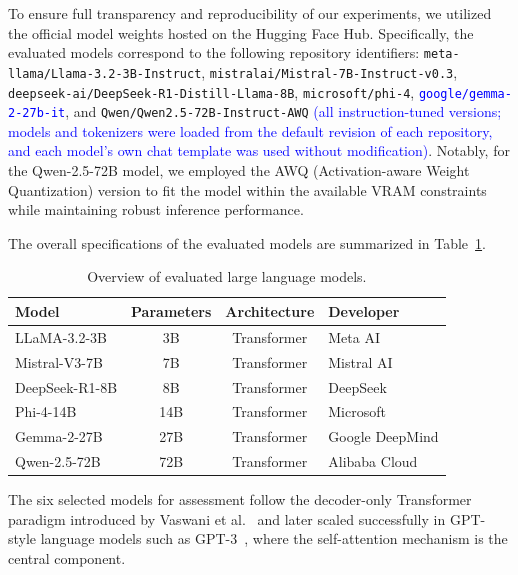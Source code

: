 \documentclass[10pt,letterpaper]{article}
\newcommand{\rev}[1]{\textcolor{blue}{#1}}
\begin{document}
To ensure full transparency and reproducibility of our experiments, we utilized the official model weights hosted on the Hugging Face Hub. Specifically, the evaluated models correspond to the following repository identifiers: \texttt{meta-llama/Llama-3.2-3B-Instruct}, \texttt{mistralai/Mistral-7B-Instruct-v0.3}, \texttt{deepseek-ai/DeepSeek-R1-Distill-Llama-8B}, \texttt{microsoft/phi-4}, \texttt{\rev{google/gemma-2-27b-it}}, and \texttt{Qwen/Qwen2.5-72B-Instruct-AWQ} \rev{(all instruction-tuned versions; models and tokenizers were loaded from the default revision of each repository, and each model's own chat template was used without modification)}. Notably, for the Qwen-2.5-72B model, we employed the AWQ (Activation-aware Weight Quantization) version to fit the model within the available VRAM constraints while maintaining robust inference performance.

The overall specifications of the evaluated models are summarized in Table~\ref{tab:models}.

\begin{table}[!t]
\centering
\small
\caption{Overview of evaluated large language models.}
\label{tab:models}
\renewcommand{\arraystretch}{1.2}
\setlength{\tabcolsep}{6pt}

\begin{tabularx}{\columnwidth}{|l|c|c|X|}
\hline
\textbf{Model} & \textbf{Parameters} & \textbf{Architecture} & \textbf{Developer} \\\hline
LLaMA-3.2-3B   & 3B  & Transformer        & Meta AI \\\hline
Mistral-V3-7B  & 7B  & Transformer        & Mistral AI \\\hline
DeepSeek-R1-8B & 8B  & Transformer        & DeepSeek \\\hline
Phi-4-14B      & 14B & Transformer        & Microsoft \\\hline
Gemma-2-27B    & 27B & Transformer        & Google DeepMind \\\hline
Qwen-2.5-72B   & 72B & Transformer        & Alibaba Cloud \\\hline
\end{tabularx}

\end{table}


The six selected models for assessment follow the decoder-only Transformer paradigm introduced by Vaswani et al.~\cite{b54} and later scaled successfully in GPT-style language models such as GPT-3~\cite{b55}, where the self-attention mechanism is the central component.
\end{document}
